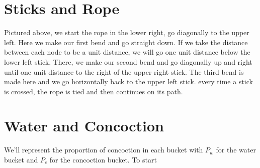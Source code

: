 \documentclass[12pt]{article}
\begin{document}
\section*{Sticks and Rope}


\begin{center}
\end{center}

Pictured above, we start the rope in the lower right, go diagonally to the upper left. Here we make our first bend and go straight down. If we take the distance between each node to be a unit distance, we will go one unit distance below the lower left stick. There, we make our second bend and go diagonally up and right until one unit distance to the right of the upper right stick. The third bend is made here and we go horizontally back to the upper left stick. every time a stick is crossed, the rope is tied and then continues on its path.

\newpage
\section*{Water and Concoction}
We'll represent the proportion of concoction in each bucket with $P_w$ for the water bucket and $P_c$ for the concoction bucket. To start
\end{document}
